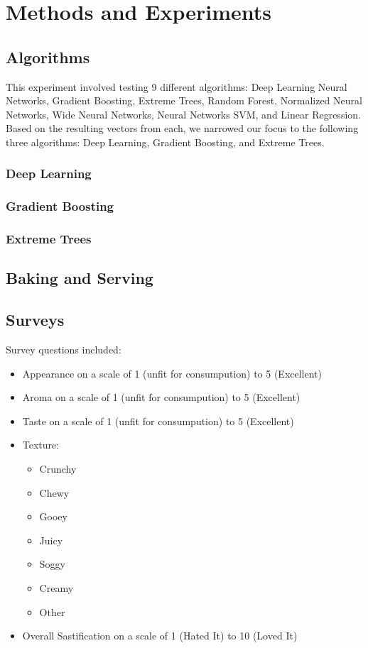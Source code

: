 \documentclass[11pt, a4paper]{article}
\begin{document}
		\section{Methods and Experiments}
		\subsection{Algorithms}
		This experiment involved testing 9 different algorithms: Deep Learning Neural Networks, Gradient Boosting, Extreme Trees, Random Forest, Normalized Neural Networks, Wide Neural Networks, Neural Networks SVM, and Linear Regression. Based on the resulting vectors from each, we narrowed our focus to the following three algorithms: Deep Learning, Gradient Boosting, and Extreme Trees.
		\subsubsection{Deep Learning}
		\subsubsection{Gradient Boosting}
		\subsubsection{Extreme Trees}
		\subsection{Baking and Serving}
		\subsection{Surveys}
		Survey questions included:
		\begin{itemize}
			\item Appearance  on a scale of 1 (unfit for consumpution) to 5 (Excellent) 
			\item Aroma on a scale of 1 (unfit for consumpution) to 5 (Excellent) 
			\item Taste on a scale of 1 (unfit for consumpution) to 5 (Excellent) 
			\item Texture:
			\begin{multicols}{2}
				\begin{itemize}
					\item Crunchy
					\item Chewy
					\item Gooey
					\item Juicy
					\item Soggy
					\item Creamy
					\item Other
				\end{itemize}
			\end{multicols}
		\item Overall Sastification on a scale of 1 (Hated It) to 10 (Loved It)
				
		\end{itemize}
\end{document}
